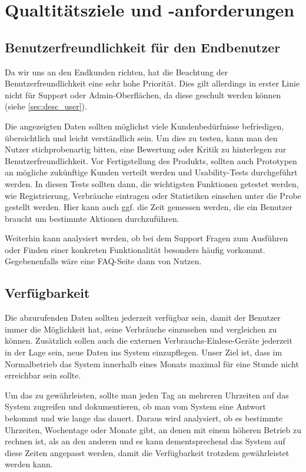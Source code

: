 \section{Qualtitätsziele und -anforderungen}
\label{quality_requirements}

\subsection{Benutzerfreundlichkeit für den Endbenutzer}
Da wir uns an den Endkunden richten, hat die Beachtung der Benutzerfreundlichkeit eine sehr hohe Priorität. Dies gilt allerdings in erster Linie nicht für Support oder Admin-Oberflächen, da diese geschult werden können (siehe \ref{sec:desc_user}).

Die angezeigten Daten sollten möglichst viele Kundenbedürfnisse
befriedigen, übersichtlich und leicht verständlich sein.
Um dies zu testen, kann man den Nutzer stichprobenartig bitten, eine Bewertung oder Kritik zu hinterlegen zur Benutzerfreundlichkeit.
Vor Fertigstellung des Produkts, sollten auch Prototypen an mögliche zukünftige Kunden verteilt werden und Usability-Tests durchgeführt werden. In diesen Tests sollten dann, die wichtigsten Funktionen getestet werden, wie Registrierung, Verbräuche eintragen oder Statistiken einsehen unter die Probe gestellt werden.
Hier kann auch ggf. die Zeit gemessen werden, die ein Benutzer braucht um bestimmte Aktionen durchzuführen.

Weiterhin kann analysiert werden, ob bei dem Support Fragen zum Ausführen oder Finden einer konkreten Funktionalität besonders häufig vorkommt. Gegebenenfalls wäre eine FAQ-Seite dann von Nutzen.

\subsection{Verfügbarkeit}
Die abzurufenden Daten sollten jederzeit verfügbar sein,
damit der Benutzer immer die Möglichkeit hat,
seine Verbräuche einzusehen und vergleichen zu können. Zusätzlich sollen auch die externen Verbrauchs-Einlese-Geräte jederzeit in der Lage sein, neue Daten ins System einzupflegen.
Unser Ziel ist, dass im Normalbetrieb das System innerhalb eines Monats maximal für eine Stunde nicht erreichbar sein sollte.

Um das zu gewährleisten, sollte man jeden Tag an mehreren Uhrzeiten auf das System zugreifen
und dokumentieren, ob man vom System eine Antwort bekommt und wie lange das dauert.
Daraus wird analysiert, ob es bestimmte Uhrzeiten, Wochentage oder Monate gibt,
an denen mit einem höheren Betrieb zu rechnen ist, als an den anderen und es kann dementsprechend das
System auf diese Zeiten angepasst werden, damit die Verfügbarkeit trotzdem gewährleistet werden kann.


